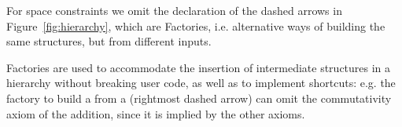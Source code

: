 \documentclass{easychair}
\begin{document}
For space constraints we omit the declaration of the dashed arrows in
Figure~\ref{fig:hierarchy}, which are Factories, i.e. alternative
ways of building the same structures, but from different inputs.

Factories are used to accommodate the insertion of intermediate
structures in a hierarchy without breaking user code, as well as to
implement shortcuts: e.g. the factory to build a  from a
 (rightmost dashed arrow) can omit the commutativity axiom
of the addition, since it is implied by the other axioms.


\end{document}
